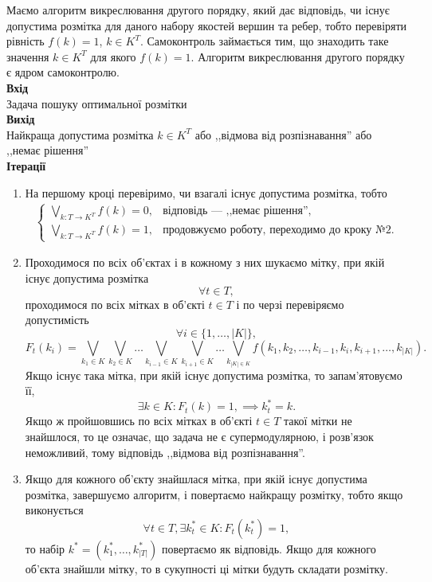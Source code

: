 Маємо алгоритм викреслювання другого порядку, який дає відповідь, чи існує
допустима розмітка для даного набору якостей вершин та ребер, 
тобто перевіряти рівність $f(k)=1$, $k\in K^T$. Самоконтроль займається тим, що
знаходить таке значення $k\in K^T$ для якого $f(k)=1$. Алгоритм викреслювання 
другого порядку є ядром самоконтролю.\\
\textbf{Вхід} \\
Задача пошуку оптимальної розмітки\\
\textbf{Вихід}\\
 Найкраща допустима розмітка $k\in K^T$ або ,,відмова від розпізнавання''
або ,,немає рішення''\\
\textbf{Ітерації}
\begin{enumerate}
    \item На першому кроці перевіримо, чи взагалі існує допустима розмітка, тобто
    \begin{equation}
    \begin{aligned}
    \begin{cases}
        \bigvee_{k:T\rightarrow K^T}f(k)=0, & \text{відповідь --- ,,немає рішення''},\\
        \bigvee_{k:T\rightarrow K^T}f(k)=1, & \text{продовжуємо роботу, переходимо до кроку №2.}
    \end{cases}
\end{aligned}
\end{equation}
\item Проходимося по всіх об'єктах і в кожному з них шукаємо мітку, при якій існує допустима розмітка
\begin{equation}
    \forall t \in T,
\end{equation}
проходимося по всіх мітках в об'єкті $t\in T$ і по черзі перевіряємо допустимість
\begin{equation}
    \forall i \in \{1,\dots, |K|\},
\end{equation}
\begin{equation}
    F_t(k_i) = \bigvee_{k_1\in K}\bigvee_{k_2\in K}\dots\bigvee_{k_{i-1}\in K}
    \bigvee_{k_{i+1}\in K}\dots\bigvee_{k_{|K|\in K}} f(k_1, k_2, \dots, k_{i-1}, k_i, k_{i+1},\dots,k_{|K|}).
\end{equation}
Якщо існує така мітка, при якій існує допустима розмітка, то запам'ятовуємо її,
\begin{equation}
   \exists k\in K: F_t(k)=1,\implies k^*_t = k.
\end{equation}
Якщо ж пройшовшись по всіх мітках в об'єкті $t\in T$ такої мітки не знайшлося, то це
означає, що задача не є супермодулярною, і розв’язок неможливий, тому відповідь 
,,відмова від розпізнавання''.
\item Якщо для кожного об'єкту знайшлася мітка, при якій існує допустима розмітка, 
завершуємо алгоритм, і повертаємо найкращу розмітку, тобто якщо виконується
\begin{equation}
    \forall t\in T,  \exists k^*_t\in K: F_t(k^*_t)=1, 
\end{equation}
то набір $k^*=(k^*_1, \dots, k^*_{|T|})$ повертаємо як відповідь.
Якщо для кожного об'єкта знайшли мітку, то в сукупності ці мітки будуть складати розмітку.
\end{enumerate}